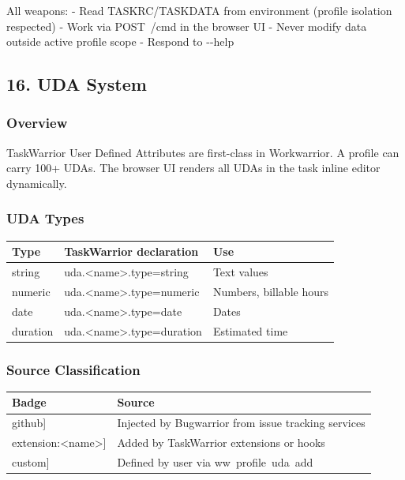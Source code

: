 \documentclass[11pt, a4paper, DIV=14]{scrartcl}
\renewcommand{\texttt}[1]{{\ttfamily\fontsize{8.5}{10.5}\selectfont\color{BabbNavy}#1}}
\let\origRule\rule
\renewcommand{\rule}[2]{\par\noindent{\color{BabbBorder}\origRule{#1}{#2}}\par}
\begin{document}
All weapons: - Read TASKRC/TASKDATA from environment (profile isolation
respected) - Work via \texttt{POST\ /cmd} in the browser UI - Never
modify data outside active profile scope - Respond to \texttt{-\/-help}

\begin{center}\rule{0.5\linewidth}{0.5pt}\end{center}

\subsection{16. UDA System}\label{uda-system}

\subsubsection{Overview}\label{overview-3}

TaskWarrior User Defined Attributes are first-class in Workwarrior. A
profile can carry 100+ UDAs. The browser UI renders all UDAs in the task
inline editor dynamically.

\subsubsection{UDA Types}\label{uda-types}

{\def\LTcaptype{none} %
\begin{longtable}[]{@{}lll@{}}
\toprule\noalign{}
Type & TaskWarrior declaration & Use \\
\midrule\noalign{}
\endhead
\bottomrule\noalign{}
\endlastfoot
string & \texttt{uda.\textless{}name\textgreater{}.type=string} & Text
values \\
numeric & \texttt{uda.\textless{}name\textgreater{}.type=numeric} &
Numbers, billable hours \\
date & \texttt{uda.\textless{}name\textgreater{}.type=date} & Dates \\
duration & \texttt{uda.\textless{}name\textgreater{}.type=duration} &
Estimated time \\
\end{longtable}
}

\subsubsection{Source Classification}\label{source-classification}

{\def\LTcaptype{none} %
\begin{longtable}[]{@{}ll@{}}
\toprule\noalign{}
Badge & Source \\
\midrule\noalign{}
\endhead
\bottomrule\noalign{}
\endlastfoot
\texttt{{[}github{]}} & Injected by Bugwarrior from issue tracking
services \\
\texttt{{[}extension:\textless{}name\textgreater{}{]}} & Added by
TaskWarrior extensions or hooks \\
\texttt{{[}custom{]}} & Defined by user via
\texttt{ww\ profile\ uda\ add} \\
\end{longtable}
}
\end{document}
